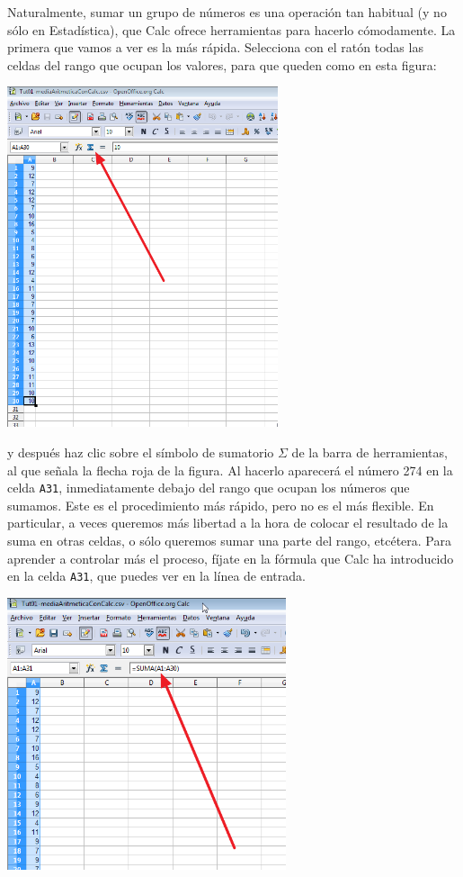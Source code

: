 \documentclass[10pt,a4paper]{article}\usepackage[]{graphicx}\usepackage[]{color}
\newcounter {cont01}
\begin{document}
Naturalmente, sumar un grupo de números es una operación tan habitual (y no sólo en Estadística), que Calc ofrece herramientas para hacerlo cómodamente. La primera que vamos a ver es la más rápida. Selecciona con el ratón todas las celdas del rango que ocupan los valores, para que queden como en esta figura:
    \begin{center}
    \includegraphics[height=10cm]{../fig/Tut01-Calc-Formula-15.png}
    \end{center}
y después haz clic sobre el símbolo de sumatorio $\Sigma$ de la barra de herramientas, al que señala la flecha roja de la figura. Al hacerlo aparecerá el número 274 en la celda {\tt A31}, inmediatamente debajo del rango que ocupan los números que sumamos. Este es el procedimiento más rápido, pero no es el más flexible. En particular, a veces queremos más libertad a la hora de colocar el resultado de la suma en otras celdas, o sólo queremos sumar una parte del rango, etcétera. Para aprender a controlar más el proceso, fíjate en la fórmula que Calc ha introducido en la celda {\tt A31}, que puedes ver en la línea de entrada.
    \begin{center}
    \includegraphics[height=8cm]{../fig/Tut01-Calc-Formula-16a.png}
    \end{center}
\end{document}
